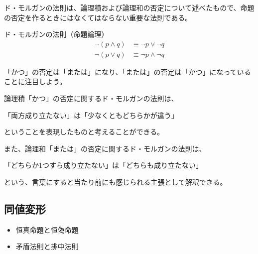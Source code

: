 \documentclass[../../imaging-math]{subfiles}
\begin{document}
ド・モルガンの法則は、論理積および論理和の否定について述べたもので、命題の否定を作るときにはなくてはならない重要な法則である。

\begin{theorem}{ド・モルガンの法則（命題論理）}
  \Large
  \begin{align*}
    \neg (p \land q) & \equiv \neg p \lor \neg q  \\
    \neg (p \lor q)  & \equiv \neg p \land \neg q
  \end{align*}
\end{theorem}

「かつ」の否定は「または」になり、「または」の否定は「かつ」になっていることに注目しよう。

\br

論理積「かつ」の否定に関するド・モルガンの法則は、
\begin{emphabox}
  \begin{spacebox}
    \begin{center}
      「両方成り立たない」は「少なくともどちらかが違う」
    \end{center}
  \end{spacebox}
\end{emphabox}
ということを表現したものと考えることができる。

\br

また、論理和「または」の否定に関するド・モルガンの法則は、
\begin{emphabox}
  \begin{spacebox}
    \begin{center}
      「どちらか1つすら成り立たない」は「どちらも成り立たない」
    \end{center}
  \end{spacebox}
\end{emphabox}
という、言葉にすると当たり前にも感じられる主張として解釈できる。

\subsection{同値変形}

\begin{mindflow}
  \begin{itemize}
    \item 恒真命題と恒偽命題
    \item 矛盾法則と排中法則
  \end{itemize}
\end{mindflow}
\end{document}
